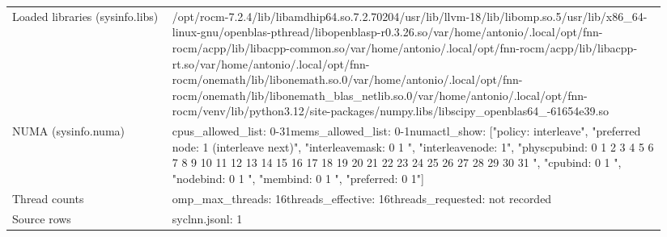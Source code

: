 \begin{longtable}{>{\raggedright\arraybackslash}p{0.23\linewidth}>{\raggedright\arraybackslash}p{0.71\linewidth}}
Loaded libraries (sysinfo.libs) & /\allowbreak{}opt/\allowbreak{}rocm-7.2.4/\allowbreak{}lib/\allowbreak{}libamdhip64.so.7.2.70204\newline /\allowbreak{}usr/\allowbreak{}lib/\allowbreak{}llvm-18/\allowbreak{}lib/\allowbreak{}libomp.so.5\newline /\allowbreak{}usr/\allowbreak{}lib/\allowbreak{}x86\_\allowbreak{}64-linux-gnu/\allowbreak{}openblas-pthread/\allowbreak{}libopenblasp-r0.3.26.so\newline /\allowbreak{}var/\allowbreak{}home/\allowbreak{}antonio/\allowbreak{}.local/\allowbreak{}opt/\allowbreak{}fnn-rocm/\allowbreak{}acpp/\allowbreak{}lib/\allowbreak{}libacpp-common.so\newline /\allowbreak{}var/\allowbreak{}home/\allowbreak{}antonio/\allowbreak{}.local/\allowbreak{}opt/\allowbreak{}fnn-rocm/\allowbreak{}acpp/\allowbreak{}lib/\allowbreak{}libacpp-rt.so\newline /\allowbreak{}var/\allowbreak{}home/\allowbreak{}antonio/\allowbreak{}.local/\allowbreak{}opt/\allowbreak{}fnn-rocm/\allowbreak{}onemath/\allowbreak{}lib/\allowbreak{}libonemath.so.0\newline /\allowbreak{}var/\allowbreak{}home/\allowbreak{}antonio/\allowbreak{}.local/\allowbreak{}opt/\allowbreak{}fnn-rocm/\allowbreak{}onemath/\allowbreak{}lib/\allowbreak{}libonemath\_\allowbreak{}blas\_\allowbreak{}netlib.so.0\newline /\allowbreak{}var/\allowbreak{}home/\allowbreak{}antonio/\allowbreak{}.local/\allowbreak{}opt/\allowbreak{}fnn-rocm/\allowbreak{}venv/\allowbreak{}lib/\allowbreak{}python3.12/\allowbreak{}site-packages/\allowbreak{}numpy.libs/\allowbreak{}libscipy\_\allowbreak{}openblas64\_\allowbreak{}-61654e39.so \\
NUMA (sysinfo.numa) & cpus\_\allowbreak{}allowed\_\allowbreak{}list: 0-31\newline mems\_\allowbreak{}allowed\_\allowbreak{}list: 0-1\newline numactl\_\allowbreak{}show: ["policy: interleave", "preferred node: 1 (interleave next)", "interleavemask: 0 1 ", "interleavenode: 1", "physcpubind: 0 1 2 3 4 5 6 7 8 9 10 11 12 13 14 15 16 17 18 19 20 21 22 23 24 25 26 27 28 29 30 31 ", "cpubind: 0 1 ", "nodebind: 0 1 ", "membind: 0 1 ", "preferred: 0 1"] \\
Thread counts & omp\_\allowbreak{}max\_\allowbreak{}threads: 16\newline threads\_\allowbreak{}effective: 16\newline threads\_\allowbreak{}requested: not recorded \\
Source rows & syclnn.jsonl: 1 \\
\end{longtable}
